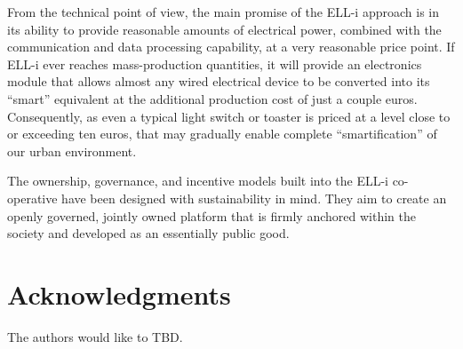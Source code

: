 \documentclass[draft,a4paper]{siamltex}
\begin{document}
From the technical point of view, the main promise of the ELL-i
approach is in its ability to provide reasonable amounts of electrical
power, combined with the communication and data processing capability,
at a very reasonable price point.  If ELL-i ever reaches
mass-production quantities, it will provide an electronics module that
allows almost any wired electrical device to be converted into its
``smart'' equivalent at the additional production cost of just a
couple euros.  Consequently, as even a typical light switch or toaster
is priced at a level close to or exceeding ten euros, that may
gradually enable complete ``smartification'' of our urban
environment. 

The ownership, governance, and incentive models built into the ELL-i
co-operative have been designed with sustainability in mind.  They aim
to create an openly governed, jointly owned platform that is firmly
anchored within the society and developed as an essentially public good.

\section*{Acknowledgments}

The authors would like to TBD.

{}

\end{document}
